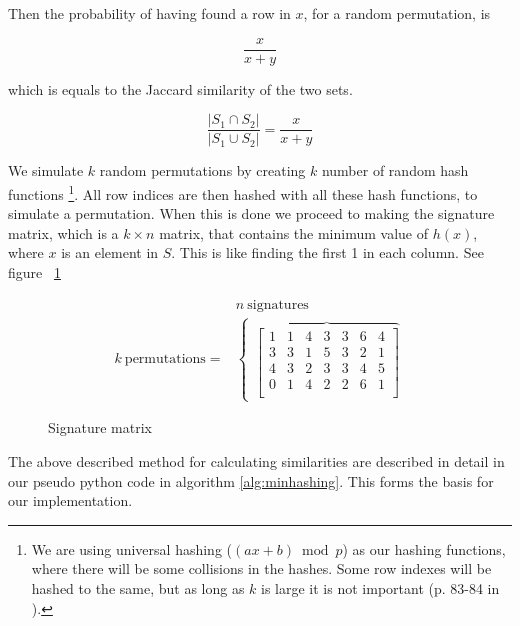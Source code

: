 \documentclass[a4paper,11pt]{article}
\begin{document}
Then the probability of having found a row in $x$, for a random permutation, is

\begin{equation*}
    \frac{x}{x+y}
\end{equation*}

which is equals to the Jaccard similarity of the two sets.

\begin{equation*}
    \frac{|S_1 \cap S_2|}{|S_1 \cup S_2|} = \frac{x}{x+y}
\end{equation*}
    
We simulate $k$ random permutations by creating $k$ number of random hash functions \footnote{We are using universal hashing ($(ax + b) \bmod p$) as our hashing functions, where there will be some collisions in the hashes. Some row indexes will be hashed to the same, but as long as $k$ is large it is not important (p. 83-84 in \cite{book:mmds}).}. All row indices are then hashed with all these hash functions, to simulate a permutation. When this is done we proceed to making the signature matrix, which is a $k\times n$ matrix, that contains the minimum value of $h(x)$, where $x$ is an element in $S$. This is like finding the first 1 in each column. See figure ~\ref{fig:signature_matrix}\\

\begin{figure}[H]
    \begin{eqnarray*}
     & n \ \text{signatures} \\
     k \ \text{permutations} = & 
        \begin{cases}
        \overbrace{
        \begin{bmatrix}
            1 & 1 & 4 & 3 & 3 & 6 & 4\\
            3 & 3 & 1 & 5 & 3 & 2 & 1\\
            4 & 3 & 2 & 3 & 3 & 4 & 5\\
            0 & 1 & 4 & 2 & 2 & 6 & 1\\
        \end{bmatrix} 
        } 
        \end{cases}
    \end{eqnarray*}
    \caption{Signature matrix}
    \label{fig:signature_matrix}
\end{figure}

The above described method for calculating similarities are described in detail in our pseudo python code in algorithm \ref{alg:minhashing}. This forms the basis for our implementation.
\end{document}
